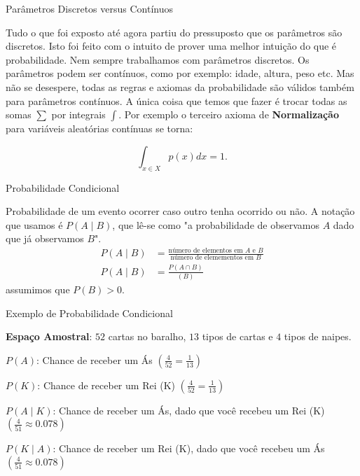 \begin{frame}{Parâmetros Discretos versus Contínuos}

	Tudo o que foi exposto até agora partiu do pressuposto que os parâmetros
	são discretos. Isto foi feito com o intuito de prover uma melhor intuição
	do que é probabilidade. Nem sempre trabalhamos com parâmetros discretos.
	Os parâmetros podem ser contínuos, como por exemplo: idade, altura, peso etc.
	Mas não se desespere, todas as regras e axiomas da probabilidade são válidos
	também para parâmetros contínuos. A única coisa que temos que fazer é trocar
	todas as somas $\sum$ por integrais $\int$. Por exemplo o terceiro axioma de
	\textbf{Normalização} para variáveis aleatórias contínuas se torna:

	$$
		\int_{x \in X} p(x) dx = 1.
	$$

\end{frame}


\begin{frame}{Probabilidade Condicional}
	\begin{defn}
		Probabilidade de um evento ocorrer caso outro tenha ocorrido ou não. \newline \newline
		A notação que usamos é $P( A \mid B )$, que lê-se como "a probabilidade
		de observamos $A$ dado que já observamos $B$". \newline \newline
		\vfill \vfill
		$$
			\begin{aligned}
				P(A \mid B) & = \frac{\text{número de elementos em $A$ e $B$}}{\text{número de elemementos em $B$}} \\
				P(A \mid B) & = \frac{P(A \cap B)}{(B)}
			\end{aligned}
		$$
		\newline \newline \hspace{0.7\textwidth}
		{\footnotesize assumimos que $P(B) > 0$}.
	\end{defn}
\end{frame}

\begin{frame}{Exemplo de Probabilidade Condicional}
	\begin{exemplo}
		\begin{vfilleditems}
			\item \textbf{Espaço Amostral}: $52$ cartas no baralho, $13$ tipos de cartas e $4$ tipos de naipes.
			\item $P(A)$: Chance de receber um Ás $\left( \frac{4}{52} = \frac{1}{13}\right)$
			\item $P(K)$: Chance de receber um Rei (K) $\left( \frac{4}{52} = \frac{1}{13} \right)$
			\item $P(A \mid K)$: Chance de receber um Ás, dado que você recebeu um Rei (K) $\left( \frac{4}{51} \approx 0.078 \right)$
			\item $P(K \mid A)$: Chance de receber um Rei (K), dado que você recebeu um Ás $\left( \frac{4}{51} \approx 0.078 \right)$
		\end{vfilleditems}
	\end{exemplo}
\end{frame}


